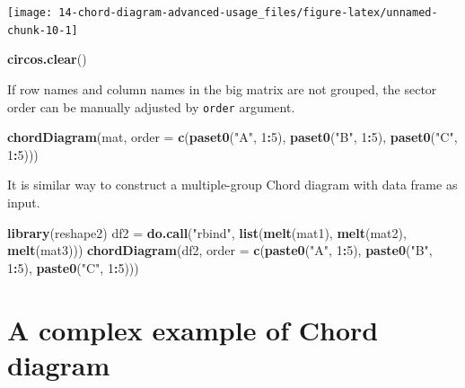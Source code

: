 \documentclass[]{book}
\newenvironment{Shaded}{\begin{snugshade}}{\end{snugshade}}
\newcommand{\KeywordTok}[1]{\textcolor[rgb]{0.13,0.29,0.53}{\textbf{#1}}}
\newcommand{\DataTypeTok}[1]{\textcolor[rgb]{0.13,0.29,0.53}{#1}}
\newcommand{\DecValTok}[1]{\textcolor[rgb]{0.00,0.00,0.81}{#1}}
\newcommand{\StringTok}[1]{\textcolor[rgb]{0.31,0.60,0.02}{#1}}
\newcommand{\OperatorTok}[1]{\textcolor[rgb]{0.81,0.36,0.00}{\textbf{#1}}}
\newcommand{\NormalTok}[1]{#1}
\begin{document}
\begin{center}\texttt{[image: 14-chord-diagram-advanced-usage\_files/figure-latex/unnamed-chunk-10-1]} \end{center}

\begin{Shaded}
\begin{Highlighting}[]
\KeywordTok{circos.clear}\NormalTok{()}
\end{Highlighting}
\end{Shaded}

If row names and column names in the big matrix are not grouped, the
sector order can be manually adjusted by \texttt{order} argument.

\begin{Shaded}
\begin{Highlighting}[]
\KeywordTok{chordDiagram}\NormalTok{(mat, }\DataTypeTok{order =} \KeywordTok{c}\NormalTok{(}\KeywordTok{paset0}\NormalTok{(}\StringTok{"A"}\NormalTok{, }\DecValTok{1}\OperatorTok{:}\DecValTok{5}\NormalTok{), }\KeywordTok{paset0}\NormalTok{(}\StringTok{"B"}\NormalTok{, }\DecValTok{1}\OperatorTok{:}\DecValTok{5}\NormalTok{), }\KeywordTok{paset0}\NormalTok{(}\StringTok{"C"}\NormalTok{, }\DecValTok{1}\OperatorTok{:}\DecValTok{5}\NormalTok{)))}
\end{Highlighting}
\end{Shaded}

It is similar way to construct a multiple-group Chord diagram with data
frame as input.

\begin{Shaded}
\begin{Highlighting}[]
\KeywordTok{library}\NormalTok{(reshape2)}
\NormalTok{df2 =}\StringTok{ }\KeywordTok{do.call}\NormalTok{(}\StringTok{"rbind"}\NormalTok{, }\KeywordTok{list}\NormalTok{(}\KeywordTok{melt}\NormalTok{(mat1), }\KeywordTok{melt}\NormalTok{(mat2), }\KeywordTok{melt}\NormalTok{(mat3)))}
\KeywordTok{chordDiagram}\NormalTok{(df2, }\DataTypeTok{order =} \KeywordTok{c}\NormalTok{(}\KeywordTok{paste0}\NormalTok{(}\StringTok{"A"}\NormalTok{, }\DecValTok{1}\OperatorTok{:}\DecValTok{5}\NormalTok{), }\KeywordTok{paste0}\NormalTok{(}\StringTok{"B"}\NormalTok{, }\DecValTok{1}\OperatorTok{:}\DecValTok{5}\NormalTok{), }\KeywordTok{paste0}\NormalTok{(}\StringTok{"C"}\NormalTok{, }\DecValTok{1}\OperatorTok{:}\DecValTok{5}\NormalTok{)))}
\end{Highlighting}
\end{Shaded}

\chapter{A complex example of Chord
diagram}\label{a-complex-example-of-chord-diagram}
\end{document}
